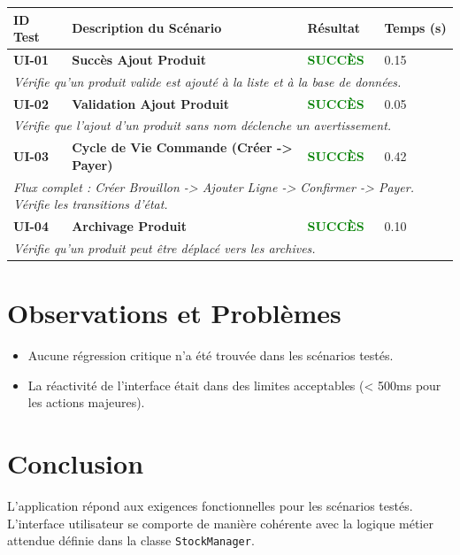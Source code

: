 \documentclass[a4paper,12pt]{article}
\newcommand{\statuspass}{\textcolor{green}{\textbf{SUCCÈS}}}
\begin{document}
\begin{longtable}{|p{1.5cm}|p{7cm}|p{3cm}|p{2cm}|}
\hline
\textbf{ID Test} & \textbf{Description du Scénario} & \textbf{Résultat} & \textbf{Temps (s)} \\
\hline
\endhead

\textbf{UI-01} & \textbf{Succès Ajout Produit} & \statuspass & 0.15 \\
\multicolumn{4}{|p{13.5cm}|}{\small \textit{Vérifie qu'un produit valide est ajouté à la liste et à la base de données.}} \\
\hline

\textbf{UI-02} & \textbf{Validation Ajout Produit} & \statuspass & 0.05 \\
\multicolumn{4}{|p{13.5cm}|}{\small \textit{Vérifie que l'ajout d'un produit sans nom déclenche un avertissement.}} \\
\hline

\textbf{UI-03} & \textbf{Cycle de Vie Commande (Créer -> Payer)} & \statuspass & 0.42 \\
\multicolumn{4}{|p{13.5cm}|}{\small \textit{Flux complet : Créer Brouillon -> Ajouter Ligne -> Confirmer -> Payer. Vérifie les transitions d'état.}} \\
\hline

\textbf{UI-04} & \textbf{Archivage Produit} & \statuspass & 0.10 \\
\multicolumn{4}{|p{13.5cm}|}{\small \textit{Vérifie qu'un produit peut être déplacé vers les archives.}} \\
\hline

\end{longtable}

\section{Observations et Problèmes}
\begin{itemize}
    \item Aucune régression critique n'a été trouvée dans les scénarios testés.
    \item La réactivité de l'interface était dans des limites acceptables (< 500ms pour les actions majeures).
\end{itemize}

\section{Conclusion}
L'application répond aux exigences fonctionnelles pour les scénarios testés. L'interface utilisateur se comporte de manière cohérente avec la logique métier attendue définie dans la classe \texttt{StockManager}.
\end{document}
